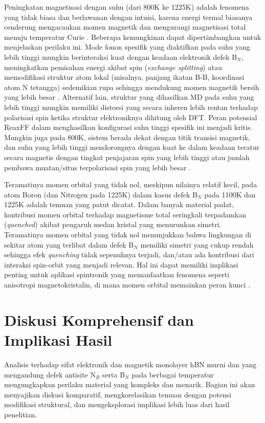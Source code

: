 Peningkatan magnetisasi dengan suhu (dari 800K ke 1225K) adalah fenomena yang tidak biasa dan berlawanan dengan intuisi, karena energi termal biasanya cenderung mengacaukan momen magnetik dan mengurangi magnetisasi total menuju temperatur Curie \cite{[1, 1]}. Beberapa kemungkinan dapat dipertimbangkan untuk menjelaskan perilaku ini. Mode fonon spesifik yang diaktifkan pada suhu yang lebih tinggi mungkin berinteraksi kuat dengan keadaan elektronik defek B$_N$, meningkatkan pemisahan energi akibat spin (\textit{exchange splitting}) atau memodifikasi struktur atom lokal (misalnya, panjang ikatan B-B, koordinasi atom N tetangga) sedemikian rupa sehingga mendukung momen magnetik bersih yang lebih besar \cite{[1]}. Alternatif lain, struktur yang dihasilkan MD pada suhu yang lebih tinggi mungkin memiliki distorsi yang secara inheren lebih rentan terhadap polarisasi spin ketika struktur elektroniknya dihitung oleh DFT. Peran potensial ReaxFF dalam menghasilkan konfigurasi suhu tinggi spesifik ini menjadi kritis. Mungkin juga pada 800K, sistem berada dekat dengan titik transisi magnetik, dan suhu yang lebih tinggi mendorongnya dengan kuat ke dalam keadaan teratur secara magnetis dengan tingkat penjajaran spin yang lebih tinggi atau jumlah pembawa muatan/situs terpolarisasi spin yang lebih besar \cite{[1]}.

Teramatinya momen orbital yang tidak nol, meskipun nilainya relatif kecil, pada atom Boron (dan Nitrogen pada 1225K) dalam kasus defek B$_N$ pada 1100K dan 1225K \cite{[1, 1]} adalah temuan yang patut dicatat. Dalam banyak material padat, kontribusi momen orbital terhadap magnetisme total seringkali terpadamkan (\textit{quenched}) akibat pengaruh medan kristal yang menurunkan simetri. Teramatinya momen orbital yang tidak nol menunjukkan bahwa lingkungan di sekitar atom yang terlibat dalam defek B$_N$ memiliki simetri yang cukup rendah sehingga efek \textit{quenching} tidak sepenuhnya terjadi, dan/atau ada kontribusi dari interaksi spin-orbit yang menjadi relevan. Hal ini dapat memiliki implikasi penting untuk aplikasi spintronik yang memanfaatkan fenomena seperti anisotropi magnetokristalin, di mana momen orbital memainkan peran kunci \cite{[1]}.

\section{Diskusi Komprehensif dan Implikasi Hasil}
\label{sec:diskusi_komprehensif}
Analisis terhadap sifat elektronik dan magnetik monolayer hBN murni dan yang mengandung defek antisite N$_B$ serta B$_N$ pada berbagai temperatur mengungkapkan perilaku material yang kompleks dan menarik. Bagian ini akan menyajikan diskusi komparatif, mengkorelasikan temuan dengan potensi modifikasi struktural, dan mengeksplorasi implikasi lebih luas dari hasil penelitian.

